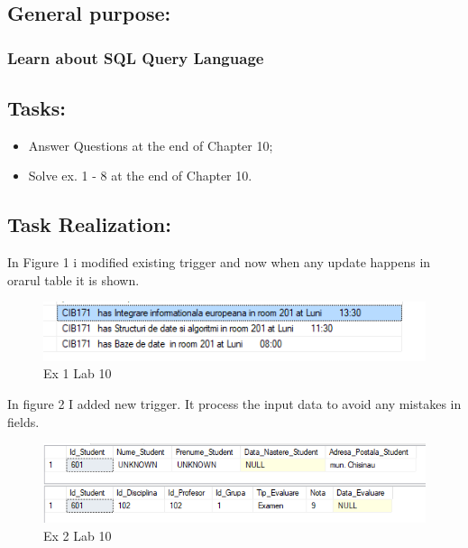 \documentclass[12pt]{article}
\begin{document}
        \pagebreak
        \subsection*{ General purpose:}
        \subsubsection*{ Learn about SQL Query Language}
        
        \subsection*{Tasks:}
        \begin{itemize}
                \item Answer Questions at the end of Chapter 10;
                \item Solve ex. 1 - 8 at the end of Chapter 10.

                
        \end{itemize}
        \subsection*{Task Realization:}
        In Figure 1 i modified existing trigger and now when any update happens in orarul table it is shown.
        \begin{figure}[H]
                \centering
                \includegraphics[width=\textwidth]{img1.png}
                \caption{Ex 1 Lab 10}
        \end{figure}
        \vspace{0.5 cm}
        
       In figure 2 I added new trigger. It process the input data to avoid any mistakes in fields.
        \begin{figure}[H]
                \centering
                \includegraphics[width=\textwidth]{img2.png}
                \caption{Ex 2 Lab 10}
        \end{figure}
        \vspace{0.5 cm}
\end{document}

